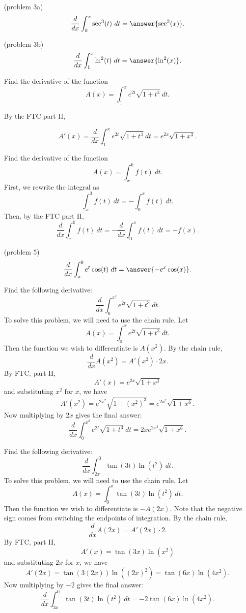 \documentclass{ximera}
\begin{document}
\begin{problem}(problem 3a)
\[\frac{d}{dx} \int_0^x \sec^3(t) \ dt = \answer{\sec^3(x)}.\]
\end{problem}

\begin{problem}(problem 3b)
\[\frac{d}{dx} \int_1^x \ln^2(t) \ dt = \answer{\ln^2(x)}.\]
\end{problem}


\begin{example}[example 4]
Find the derivative of the function 
\[A(x) = \int_1^x e^{2t}\sqrt{1+t^3} \ dt.\]

By the FTC part II,

 \[A'(x) = \frac{d}{dx}\int_1^x e^{2t}\sqrt{1+t^3} \ dt = e^{2x}\sqrt{1+x^3}.\]
\end{example} 

\begin{example}[example 5]
Find the derivative of the function 
\[A(x) = \int_x^0 f(t) \ dt.\]
First, we rewrite the integral as
\[\int_x^0 f(t) \ dt =-\int_0^x f(t) \ dt.\]
Then, by the FTC part II,
\[\frac{d}{dx}\int_x^0 f(t) \ dt = -\frac{d}{dx}\int_0^x f(t) \ dt =-f(x).\] 
\end{example}

\begin{problem}(problem 5)
\[\frac{d}{dx} \int_x^0 e^t\cos(t) \ dt = \answer{-e^x\cos(x)}.\]
\end{problem}

  
\begin{example}[example 6]
Find the following derivative:
\[\frac{d}{dx} \int_0^{x^2} e^{2t}\sqrt{1+t^3} \ dt.\]
To solve this problem, we will need to use the chain rule. Let 
\[A(x) = \int_0^x e^{2t}\sqrt{1+t^3} \ dt.\]
Then the function we wish to differentiate is $A(x^2)$.
By the chain rule, 
\[\frac{d}{dx} A(x^2) = A'(x^2) \cdot 2x.\]
By FTC, part II,
\[A'(x) = e^{2x}\sqrt{1+x^3}\]
and substituting $x^2$ for $x$, we have
\[A'(x^2) = e^{2x^2}\sqrt{1+(x^2)^3} = e^{2x^2}\sqrt{1+x^6}.\]
Now multiplying by $2x$ gives the final answer:
\[\frac{d}{dx}\int_0^{x^2} e^{2t}\sqrt{1+t^3} \ dt  = 
2xe^{2x^2}\sqrt{1+x^6}.\]
\end{example}

\begin{example}[example 7]
Find the following derivative:
\[\frac{d}{dx} \int_{2x}^0 \tan(3t) \ln(t^2) \ dt.\]
To solve this problem, we will need to use the chain rule. Let 
\[A(x) = \int_0^x \tan(3t) \ln(t^2) \ dt.\]
Then the function we wish to differentiate is $-A(2x)$.
Note that the negative sign comes from switching the endpoints of integration.
By the chain rule, 
\[\frac{d}{dx} A(2x) = A'(2x) \cdot 2.\]
By FTC, part II,
\[A'(x) = \tan(3x) \ln(x^2)\]
and substituting $2x$ for $x$, we have
\[A'(2x) = \tan(3(2x)) \ln((2x)^2) = \tan(6x) \ln(4x^2).\]
Now multiplying by $-2$ gives the final answer:
\[\frac{d}{dx} \int_{2x}^0 \tan(3t) \ln(t^2) \ dt  = -2\tan(6x)\ln(4x^2).\]
\end{example}
\end{document}
